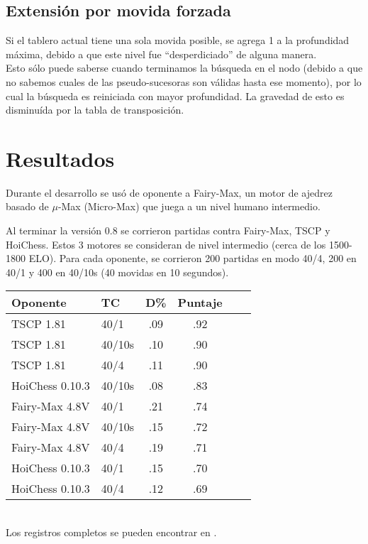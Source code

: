 \documentclass{article}
\begin{document}
\begin{multicols}{2}
\subsection{Extensión por movida forzada}
Si el tablero actual tiene una sola movida posible, se agrega 1 a la
profundidad máxima, debido a que este nivel fue ``desperdiciado'' de
alguna manera.
\\

Esto sólo puede saberse cuando terminamos la búsqueda en el nodo
(debido a que no sabemos cuales de las pseudo-sucesoras son válidas
hasta ese momento), por lo cual la búsqueda es reiniciada con mayor
profundidad. La gravedad de esto es disminuída por la tabla de
transposición.

\section{Resultados}
Durante el desarrollo se usó de oponente a Fairy-Max\cite{fairymax}, un
motor de ajedrez basado de $\mu$-Max (Micro-Max) que juega a un nivel
humano intermedio.

Al terminar la versión 0.8 se corrieron partidas contra Fairy-Max, TSCP
y HoiChess. Estos 3 motores se consideran de nivel intermedio (cerca de
los 1500-1800 ELO). Para cada oponente, se corrieron 200 partidas en
modo 40/4, 200 en 40/1 y 400 en 40/10s (40 movidas en 10 segundos).

\begin{tabular}{|l|l|c|c|c|c|}
\hline
Oponente        & TC     & D\% & Puntaje \\ \hline
TSCP 1.81       & 40/1   & .09 & .92 \\ \hline
TSCP 1.81       & 40/10s & .10 & .90 \\ \hline
TSCP 1.81       & 40/4   & .11 & .90 \\ \hline
HoiChess 0.10.3 & 40/10s & .08 & .83 \\ \hline
Fairy-Max 4.8V  & 40/1   & .21 & .74 \\ \hline
Fairy-Max 4.8V  & 40/10s & .15 & .72 \\ \hline
Fairy-Max 4.8V  & 40/4   & .19 & .71 \\ \hline
HoiChess 0.10.3 & 40/1   & .15 & .70 \\ \hline
HoiChess 0.10.3 & 40/4   & .12 & .69 \\ \hline
\end{tabular}
\\

Los registros completos se pueden encontrar en \cite{logs}.
\\


\end{multicols}
\end{document}
